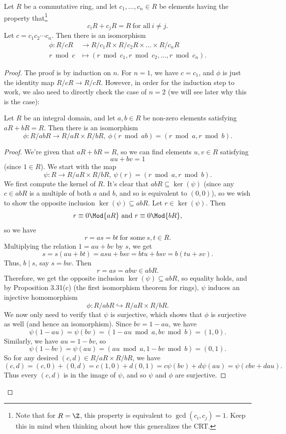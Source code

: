 \documentclass[math1530-lecture-notes]{subfiles}
\begin{document}
\begin{theorem}{}
  Let $R$ be a commutative ring, and let $c_1,\ldots,c_n\in R$ be elements having the property
  that\footnote{Note that for $R=\Z$, this property is equivalent to $\gcd{(c_i,c_j)}=1$. Keep this
  in mind when thinking about how this generalizes the CRT.}
  \[
    c_iR+c_jR=R~\text{for all}~i\neq j
  .\] Let $c=c_1c_2\cdots c_n$. Then there is an isomorphism \begin{align*}
    \phi: R /cR &\longrightarrow R /c_1R\times R /c_2R\times \ldots\times R / c_nR \\
    r\bmod{c} &\longmapsto (r\bmod{c_1}, r\bmod{c_2},\ldots,r\bmod{c_n})
  .\end{align*}
\end{theorem}
\begin{proof}[Proof]
  The proof is by induction on $n$. For $n=1$, we have $c=c_1$, and $\phi$ is just the identity map
  $R /cR\to R /cR$. However, in order for the induction step to work, we also need to directly check
  the case of $n=2$ (we will see later why this is the case):
  \begin{lemma}{}
    Let $R$ be an integral domain, and let $a,b\in R$ be non-zero elements satisfying $aR+bR=R$.
    Then there is an isomorphism \[
      \phi:R / abR\longrightarrow R /aR\times R /bR,\ \phi(r\bmod{ab})=(r\bmod{a},r\bmod{b})
    .\] 
  \end{lemma}
  \begin{proof}[Proof]
    We're given that $aR+bR=R$, so we can find elements $u,v\in R$ satisfying \[
      au+bv=1
    \] (since $1\in R$). We start with the map \[
    \psi:R\longrightarrow R/aR\times R/bR,\ \psi(r)=(r\bmod{a}, r\bmod{b})
  .\] We first compute the kernel of $R$. It's clear that $abR\subseteq \ker{(\psi)}$ (since any
  $c\in abR$ is a multiple of both $a$ and $b$, and so is equivalent to $(0,0)$), so we wish to show
  the opposite inclusion $\ker{(\psi)}\subseteq abR$. Let $r\in \ker{(\psi)}$. Then \[
    r\equiv 0\Mod{aR}~\text{and}~r\equiv 0\Mod{bR}
  ,\] so we have \[
    r=as=bt~\text{for some}~s,t\in R
  .\] Multiplying the relation $1=au+bv$ by $s$, we get \[
    s=s(au+bt)=asu+bsv=btu+bsv=b(tu+sv)
  .\] Thus, $b\mid s$, say $s=bw$. Then \[
    r=as=abw\in abR
  .\] Therefore, we get the opposite inclusion $\ker{(\psi)}\subseteq abR$, so equality holds, and
  by Proposition 3.31(c) (the first isomorphism theorem for rings), $\psi$ induces an injective
  homomorphism \[
    \phi:R/abR\hookrightarrow R/aR\times R /bR
  .\] We now only need to verify that $\psi$ is surjective, which shows that $\phi$ is surjective as
  well (and hence an isomorphism). Since $bv=1-au$, we have \[
    \psi(1-au)=\psi(bv)=(1-au\bmod{a}, bv\bmod{b})=(1,0)
  .\] Similarly, we have $au=1-bv$, so \[
    \psi(1-bv)=\psi(au)=(au\bmod{a},1-bv\bmod{b})=(0,1)
  .\] So for any desired $(c,d)\in R /aR\times R /bR$, we have \[
    (c,d)=(c,0)+(0,d)=c(1,0)+d(0,1)=c\psi(bv)+d\psi(au)=\psi(cbv+dau)
  .\] Thus every $(c,d)$ is in the image of $\psi$, and so $\psi$ and $\phi$ are surjective.
  \end{proof}


\end{proof}
\end{document}
